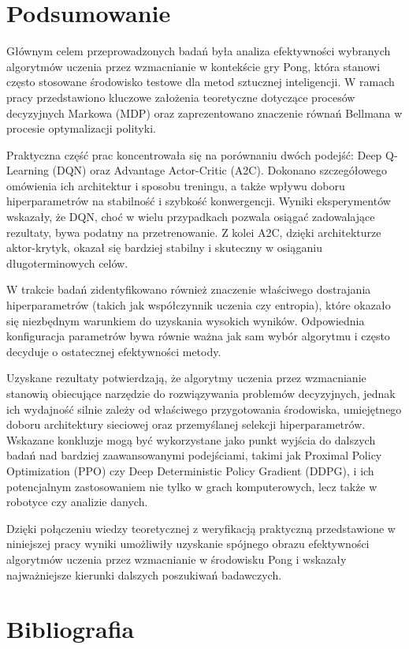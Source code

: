 \documentclass[a4paper, 12pt]{article}
\numberwithin{equation}{section}
\begin{document}
    \section{Podsumowanie}
    Głównym celem przeprowadzonych badań była analiza efektywności wybranych algorytmów uczenia przez wzmacnianie w kontekście gry Pong, która stanowi często stosowane środowisko testowe dla metod sztucznej inteligencji. W ramach pracy przedstawiono kluczowe założenia teoretyczne dotyczące procesów decyzyjnych Markowa (MDP) oraz zaprezentowano znaczenie równań Bellmana w procesie optymalizacji polityki.

    Praktyczna część prac koncentrowała się na porównaniu dwóch podejść: Deep Q-Learning (DQN) oraz Advantage Actor-Critic (A2C). Dokonano szczegółowego omówienia ich architektur i sposobu treningu, a także wpływu doboru hiperparametrów na stabilność i szybkość konwergencji. Wyniki eksperymentów wskazały, że DQN, choć w wielu przypadkach pozwala osiągać zadowalające rezultaty, bywa podatny na przetrenowanie. Z kolei A2C, dzięki architekturze aktor-krytyk, okazał się bardziej stabilny i skuteczny w osiąganiu długoterminowych celów.

    W trakcie badań zidentyfikowano również znaczenie właściwego dostrajania hiperparametrów (takich jak współczynnik uczenia czy entropia), które okazało się niezbędnym warunkiem do uzyskania wysokich wyników. Odpowiednia konfiguracja parametrów bywa równie ważna jak sam wybór algorytmu i często decyduje o ostatecznej efektywności metody.

    Uzyskane rezultaty potwierdzają, że algorytmy uczenia przez wzmacnianie stanowią obiecujące narzędzie do rozwiązywania problemów decyzyjnych, jednak ich wydajność silnie zależy od właściwego przygotowania środowiska, umiejętnego doboru architektury sieciowej oraz przemyślanej selekcji hiperparametrów. Wskazane konkluzje mogą być wykorzystane jako punkt wyjścia do dalszych badań nad bardziej zaawansowanymi podejściami, takimi jak Proximal Policy Optimization (PPO) czy Deep Deterministic Policy Gradient (DDPG), i ich potencjalnym zastosowaniem nie tylko w grach komputerowych, lecz także w robotyce czy analizie danych.

    Dzięki połączeniu wiedzy teoretycznej z weryfikacją praktyczną przedstawione w niniejszej pracy wyniki umożliwiły uzyskanie spójnego obrazu efektywności algorytmów uczenia przez wzmacnianie w środowisku Pong i wskazały najważniejsze kierunki dalszych poszukiwań badawczych.
    \section{Bibliografia}
    \printbibliography
\end{document}
